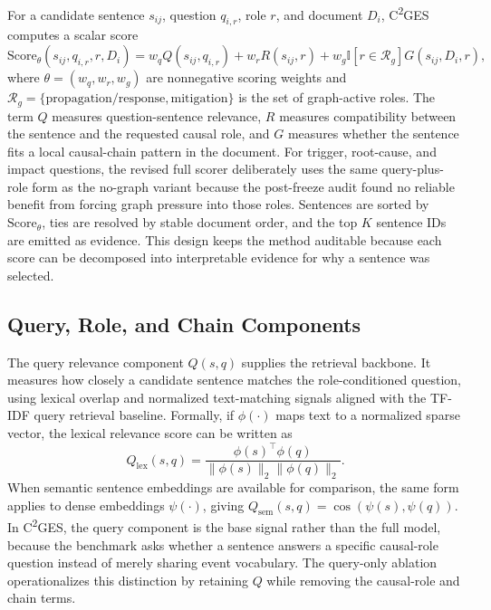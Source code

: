 \documentclass{article}
\begin{document}
For a candidate sentence $s_{ij}$, question $q_{i,r}$, role $r$, and document $D_i$, C\textsuperscript{2}GES computes a scalar score
\begin{equation}
\mathrm{Score}_{\theta}(s_{ij},q_{i,r},r,D_i)
=
w_q Q(s_{ij},q_{i,r})
+
w_r R(s_{ij},r)
+
w_g \mathbb{I}[r\in\mathcal{R}_g]G(s_{ij},D_i,r),
\label{eq:score}
\end{equation}
where $\theta=(w_q,w_r,w_g)$ are nonnegative scoring weights and $\mathcal{R}_g=\{\text{propagation/response},\text{mitigation}\}$ is the set of graph-active roles. The term $Q$ measures question-sentence relevance, $R$ measures compatibility between the sentence and the requested causal role, and $G$ measures whether the sentence fits a local causal-chain pattern in the document. For trigger, root-cause, and impact questions, the revised full scorer deliberately uses the same query-plus-role form as the no-graph variant because the post-freeze audit found no reliable benefit from forcing graph pressure into those roles. Sentences are sorted by $\mathrm{Score}_{\theta}$, ties are resolved by stable document order, and the top $K$ sentence IDs are emitted as evidence. This design keeps the method auditable because each score can be decomposed into interpretable evidence for why a sentence was selected.

\subsection{Query, Role, and Chain Components}
\label{sec:components}

The query relevance component $Q(s,q)$ supplies the retrieval backbone. It measures how closely a candidate sentence matches the role-conditioned question, using lexical overlap and normalized text-matching signals aligned with the TF-IDF query retrieval baseline. Formally, if $\phi(\cdot)$ maps text to a normalized sparse vector, the lexical relevance score can be written as
\begin{equation}
Q_{\mathrm{lex}}(s,q)=
\frac{\phi(s)^\top \phi(q)}
{\|\phi(s)\|_2\|\phi(q)\|_2}.
\label{eq:qlex}
\end{equation}
When semantic sentence embeddings are available for comparison, the same form applies to dense embeddings $\psi(\cdot)$, giving $Q_{\mathrm{sem}}(s,q)=\cos(\psi(s),\psi(q))$. In C\textsuperscript{2}GES, the query component is the base signal rather than the full model, because the benchmark asks whether a sentence answers a specific causal-role question instead of merely sharing event vocabulary. The query-only ablation operationalizes this distinction by retaining $Q$ while removing the causal-role and chain terms.
\end{document}
